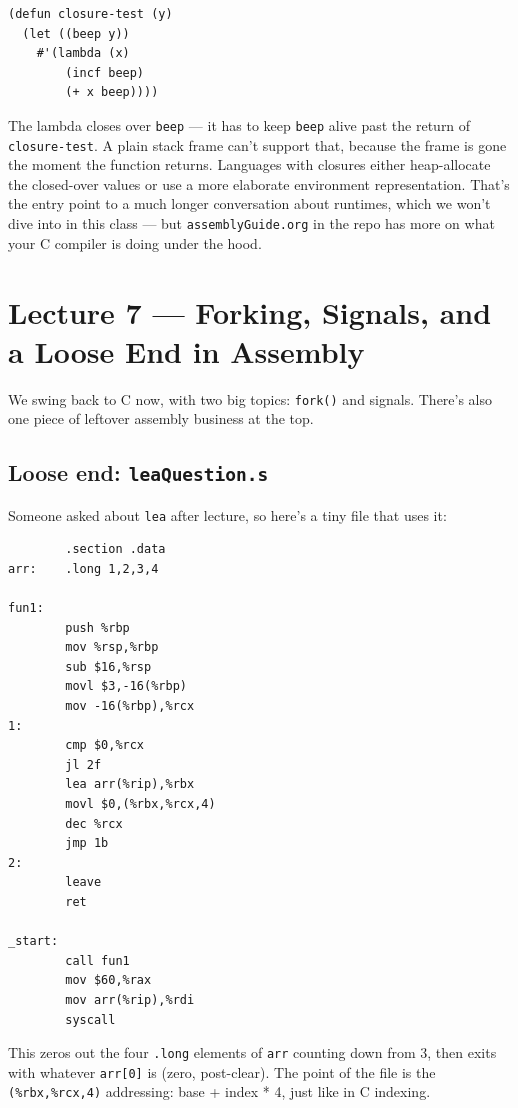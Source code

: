 \documentclass[11pt]{article}
\begin{document}
\begin{lstlisting}
(defun closure-test (y)
  (let ((beep y))
    #'(lambda (x)
        (incf beep)
        (+ x beep))))
\end{lstlisting}

The lambda closes over \texttt{beep} --- it has to keep
\texttt{beep} alive past the return of \texttt{closure-test}. A
plain stack frame can't support that, because the frame is gone the
moment the function returns. Languages with closures either heap-allocate
the closed-over values or use a more elaborate environment representation.
That's the entry point to a much longer conversation about runtimes,
which we won't dive into in this class --- but
\texttt{assemblyGuide.org} in the repo has more on what your C
compiler is doing under the hood.

\section{Lecture 7 --- Forking, Signals, and a Loose End in Assembly}

We swing back to C now, with two big topics: \texttt{fork()} and
signals. There's also one piece of leftover assembly business at
the top.

\subsection*{Loose end: \texttt{leaQuestion.s}}

Someone asked about \texttt{lea} after lecture, so here's a tiny
file that uses it:

\begin{lstlisting}
        .section .data
arr:    .long 1,2,3,4

fun1:
        push %rbp
        mov %rsp,%rbp
        sub $16,%rsp
        movl $3,-16(%rbp)
        mov -16(%rbp),%rcx
1:
        cmp $0,%rcx
        jl 2f
        lea arr(%rip),%rbx
        movl $0,(%rbx,%rcx,4)
        dec %rcx
        jmp 1b
2:
        leave
        ret

_start:
        call fun1
        mov $60,%rax
        mov arr(%rip),%rdi
        syscall
\end{lstlisting}

This zeros out the four \texttt{.long} elements of \texttt{arr}
counting down from 3, then exits with whatever \texttt{arr[0]} is
(zero, post-clear). The point of the file is the
\texttt{(\%rbx,\%rcx,4)} addressing: base + index * 4, just like in
C indexing.
\end{document}
